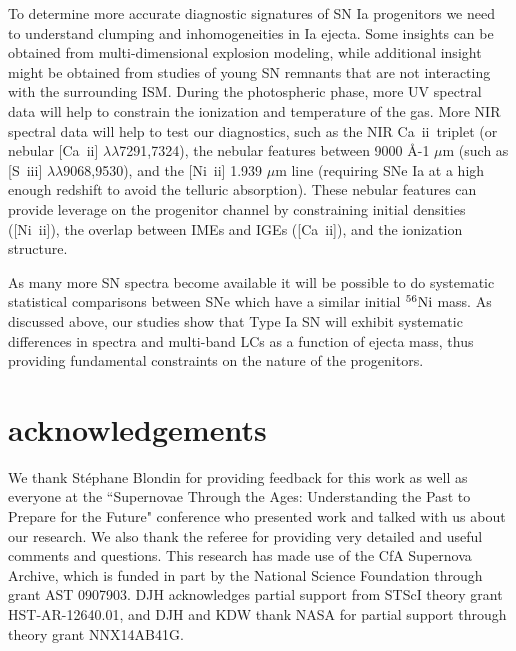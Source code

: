 \documentclass[useAMS,usenatbib,useasmath]{mnras}
\newcommand{\elem}[2][default]{$^{#1}{\rm #2}$}
\newcommand{\caii}{\mbox{Ca~{\sc ii}}}
\newcommand{\nkii}{\mbox{Ni~{\sc ii}}}
\newcommand{\siii}{\mbox{S~{\sc iii}}}
\newcommand{\lb}{$\lambda$}
\begin{document}
To determine more accurate diagnostic signatures of SN Ia progenitors we need to understand clumping and inhomogeneities in Ia ejecta. Some insights can be obtained from multi-dimensional explosion modeling, while additional insight might be obtained from studies of young SN remnants that are not interacting with the surrounding ISM.  During the photospheric phase, more UV spectral data will help to constrain the ionization and temperature of the gas. More NIR spectral data will help to test our diagnostics, such as the NIR \caii\ triplet (or nebular [\caii] \lb\lb7291,7324), the nebular features between 9000 \AA-1 $\mu$m (such as [\siii] \lb\lb9068,9530), and the [\nkii] 1.939 $\mu$m line (requiring SNe Ia at a high enough redshift to avoid the telluric absorption). These nebular features can provide leverage on the progenitor channel by constraining initial densities ([\nkii]), the overlap between IMEs and IGEs ([\caii]), and the ionization structure. 

As many more SN spectra become available it will be possible to do systematic statistical comparisons between SNe which have a similar initial \elem[56]{Ni} mass. As discussed above, our studies show that Type Ia SN will exhibit systematic differences in spectra and multi-band LCs as a function of ejecta mass, thus providing fundamental constraints on the nature of the progenitors.

\section*{acknowledgements}%
We thank St\'{e}phane Blondin for providing feedback for this work as well as everyone at the ``Supernovae Through the Ages: Understanding the Past to Prepare for the Future" conference who presented work and talked with us about our research. We also thank the referee for providing very detailed and useful comments and questions. This research has made use of the CfA Supernova Archive, which is funded in part by the National Science Foundation through grant AST 0907903.  DJH acknowledges partial support from STScI theory grant HST-AR-12640.01, and DJH and KDW thank NASA for partial support through theory grant NNX14AB41G. 
%
%


\label{lastpage}
\end{document}
